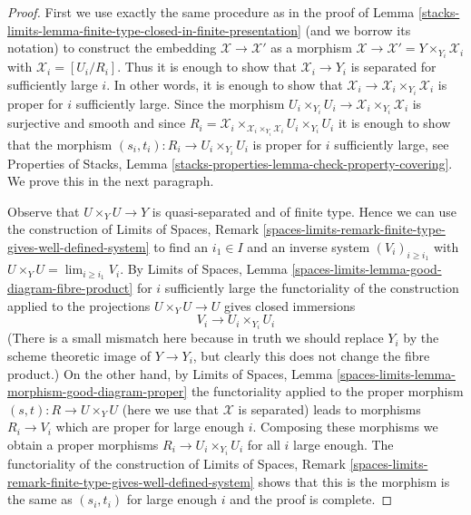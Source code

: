 \begin{proof}
First we use exactly the same procedure as in the proof of
Lemma \ref{stacks-limits-lemma-finite-type-closed-in-finite-presentation}
(and we borrow its notation)
to construct the embedding $\mathcal{X} \to \mathcal{X}'$ as a morphism
$\mathcal{X} \to \mathcal{X}' = Y \times_{Y_i} \mathcal{X}_i$ with
$\mathcal{X}_i = [U_i/R_i]$.
Thus it is enough to show that $\mathcal{X}_i \to Y_i$ is
separated for sufficiently large $i$.
In other words, it is enough to show that
$\mathcal{X}_i \to \mathcal{X}_i \times_{Y_i} \mathcal{X}_i$
is proper for $i$ sufficiently large. Since the morphism
$U_i \times_{Y_i} U_i \to \mathcal{X}_i \times_{Y_i} \mathcal{X}_i$
is surjective and smooth and since
$R_i = \mathcal{X}_i
\times_{\mathcal{X}_i \times_{Y_i} \mathcal{X}_i} U_i \times_{Y_i} U_i$
it is enough to show that the morphism
$(s_i, t_i) : R_i \to U_i \times_{Y_i} U_i$
is proper for $i$ sufficiently large, see
Properties of Stacks, Lemma
\ref{stacks-properties-lemma-check-property-covering}.
We prove this in the next paragraph.

\medskip\noindent
Observe that $U \times_Y U \to Y$ is quasi-separated and of finite type.
Hence we can use the construction of
Limits of Spaces, Remark
\ref{spaces-limits-remark-finite-type-gives-well-defined-system}
to find an $i_1 \in I$ and an inverse system $(V_i)_{i \geq i_1}$
with $U \times_Y U = \lim_{i \geq i_1} V_i$.
By Limits of Spaces, Lemma \ref{spaces-limits-lemma-good-diagram-fibre-product}
for $i$ sufficiently large the functoriality of the construction
applied to the projections $U \times_Y U \to U$
gives closed immersions
$$
V_i \to U_i \times_{Y_i} U_i
$$
(There is a small mismatch here because in truth we should replace
$Y_i$ by the scheme theoretic image of $Y \to Y_i$, but clearly this
does not change the fibre product.)
On the other hand, by Limits of Spaces, Lemma
\ref{spaces-limits-lemma-morphism-good-diagram-proper}
the functoriality applied to the proper morphism
$(s, t) : R \to U \times_Y U$ (here we use that $\mathcal{X}$ is separated)
leads to morphisms $R_i \to V_i$ which are proper for
large enough $i$.
Composing these morphisms we obtain a proper morphisms
$R_i \to U_i \times_{Y_i} U_i$ for all $i$ large enough.
The functoriality of the construction of
Limits of Spaces, Remark
\ref{spaces-limits-remark-finite-type-gives-well-defined-system}
shows that this is the morphism is the same as $(s_i, t_i)$
for large enough $i$ and the proof is complete.
\end{proof}

